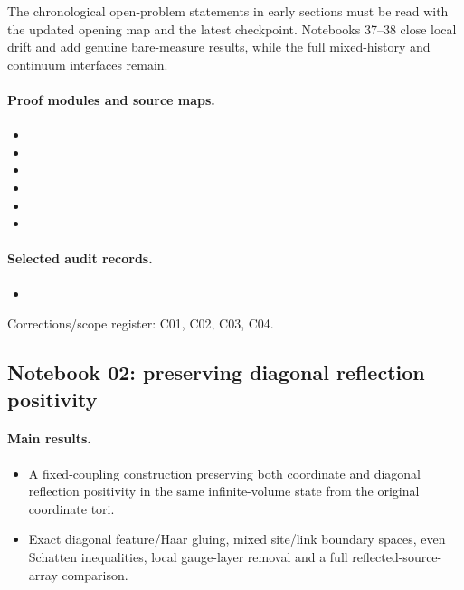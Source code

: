 The chronological open-problem statements in early sections must be read with the updated opening map and the latest checkpoint. Notebooks 37--38 close local drift and add genuine bare-measure results, while the full mixed-history and continuum interfaces remain.

\paragraph{Proof modules and source maps.}
\begingroup\small
\begin{itemize}
\item {}
\item {}
\item {}
\item {}
\item {}
\item {}
\end{itemize}
\endgroup

\paragraph{Selected audit records.}
\begingroup\small
\begin{itemize}
\item {}
\end{itemize}
\endgroup
Corrections/scope register: C01, C02, C03, C04.\par

\subsection{Notebook 02: preserving diagonal reflection positivity}
\label{hnc-02}
\noindent{}\par

\paragraph{Main results.}
\begin{itemize}
\item A fixed-coupling construction preserving both coordinate and diagonal reflection positivity in the same infinite-volume state from the original coordinate tori.
\item Exact diagonal feature/Haar gluing, mixed site/link boundary spaces, even Schatten inequalities, local gauge-layer removal and a full reflected-source-array comparison.
\end{itemize}

